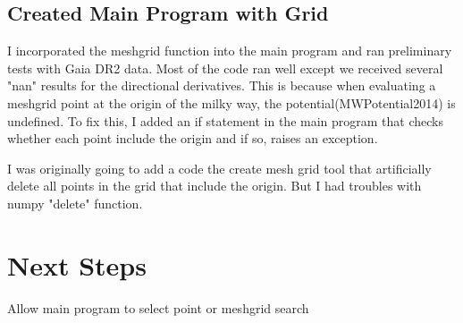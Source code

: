 \documentclass[12pt]{article}
\begin{document}
\subsection{Created Main Program with Grid}
I incorporated the meshgrid function into the main program and ran preliminary tests with Gaia DR2 data. Most of the code ran well except we received several "nan" results for the directional derivatives. This is because when evaluating a meshgrid point at the origin of the milky way, the potential(MWPotential2014) is undefined. To fix this, I added an if statement in the main program that checks whether each point include the origin and if so, raises an exception.

I was originally going to add a code the create mesh grid tool that artificially delete all points in the grid that include the origin. But I had troubles with numpy "delete" function.

\section{Next Steps} 
Allow main program to select point or meshgrid search 
\end{document}
